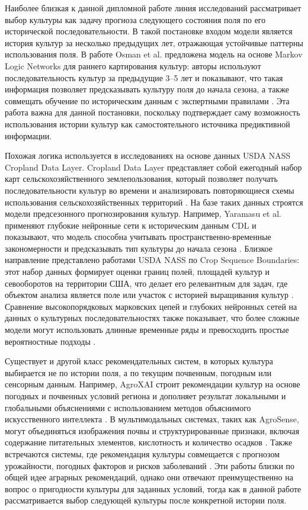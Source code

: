 Наиболее близкая к данной дипломной работе линия исследований рассматривает выбор культуры как задачу прогноза
следующего состояния поля по его исторической последовательности. В такой постановке входом модели является история
культур за несколько предыдущих лет, отражающая устойчивые паттерны использования поля. В работе Osman et al.
предложена модель на основе Markov Logic Networks для раннего картирования культур: авторы используют последовательность
культур за предыдущие 3--5 лет и показывают, что такая информация позволяет предсказывать культуру поля до начала
сезона, а также совмещать обучение по историческим данным с экспертными правилами
\cite{osman2015markov_logic}. Эта работа важна для данной постановки, поскольку подтверждает саму возможность
использования истории культур как самостоятельного источника предиктивной информации.

Похожая логика используется в исследованиях на основе данных USDA NASS Cropland Data Layer. Cropland Data Layer
представляет собой ежегодный набор карт сельскохозяйственного землепользования, который позволяет получать последовательности
культур во времени и анализировать повторяющиеся схемы использования сельскохозяйственных территорий
\cite{boryan2011cdl}. На базе таких данных строятся модели предсезонного прогнозирования культур. Например,
Yaramasu et al. применяют глубокие нейронные сети к историческим данным CDL и показывают, что модель способна учитывать
пространственно-временные закономерности и предсказывать тип культуры до начала сезона
\cite{yaramasu2020preseason}. Близкое направление представлено работами USDA NASS по Crop Sequence Boundaries:
этот набор данных формирует оценки границ полей, площадей культур и севооборотов на территории США, что делает его
релевантным для задач, где объектом анализа является поле или участок с историей выращивания культур
\cite{nass2026csb}. Сравнение высокопорядковых марковских цепей и глубоких нейронных сетей на данных о культурных
последовательностях также показывает, что более сложные модели могут использовать длинные временные ряды и превосходить
простые вероятностные подходы \cite{sartore2023homc_dnn}.

Существует и другой класс рекомендательных систем, в которых культура выбирается не по истории поля, а по текущим
почвенным, погодным или сенсорным данным. Например, AgroXAI строит рекомендации культур на основе погодных и почвенных
условий региона и дополняет результат локальными и глобальными объяснениями с использованием методов объяснимого
искусственного интеллекта \cite{turgut2024agroxai}. В мультимодальных системах, таких как AgroSense, могут
объединяться изображения почвы и структурированные признаки, включая содержание питательных элементов, кислотность и
количество осадков \cite{pandey2025agrosense}. Также встречаются системы, где рекомендация культуры совмещается с
прогнозом урожайности, погодных факторов и рисков заболеваний \cite{ahmed2024crop_yield_disease}. Эти работы близки по
общей идее аграрных рекомендаций, однако они отвечают преимущественно на вопрос о пригодности культуры для заданных
условий, тогда как в данной работе рассматривается выбор следующей культуры после конкретной истории поля.

